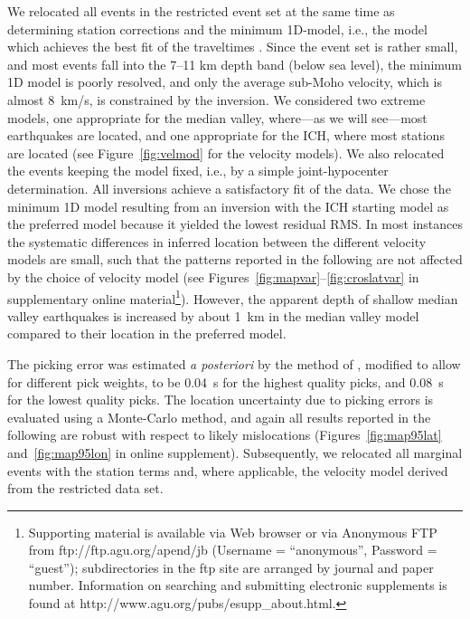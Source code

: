 \documentclass[aguplus]{aguplus}
\newlength{\tw}
\begin{document}
\begin{article}
We relocated all events in the restricted event set at the same time
as determining station corrections and the minimum
1D-model, i.e., the model which achieves the best fit of the traveltimes \citep[using VELEST,][]{kissling94}.  Since the event set is rather small, and most events
fall into the 7--11 km depth band (below sea level), the
minimum 1D model is poorly resolved, and only the average sub-Moho
velocity, which is almost 8~km/s,
is constrained by the inversion.
  We considered two extreme  models, one appropriate for
the median valley, where---as we will see---most earthquakes are located, and
one appropriate for the ICH, where most stations are located (see
Figure~\ref{fig:velmod} for the velocity models). We also
relocated the events keeping the model fixed, i.e., by a simple
joint-hypocenter determination.  All inversions achieve a satisfactory fit of
the data. We chose the minimum 1D model resulting from an inversion with the
ICH starting model as the preferred model because it yielded the
lowest residual RMS.  In most instances the systematic differences in
inferred location between the different velocity models are small, such
that the patterns reported in the following are not affected by the
choice of velocity model (see Figures~\ref{fig:mapvar}--\ref{fig:croslatvar} in supplementary
online material\footnote{Supporting material is available via Web browser or via Anonymous FTP
from ftp://ftp.agu.org/apend/jb (Username = ``anonymous'', Password =
``guest''); subdirectories in the ftp site are arranged by journal and
paper number. Information on searching and submitting electronic
supplements is found at http://www.agu.org/pubs/esupp\_about.html.
}).
However, the apparent depth of shallow median valley earthquakes is
increased by about 1~km in the median valley model compared to their
location in the preferred model.

The picking error was estimated {\it a posteriori} by the method of
\citet{wilcock91}, modified to allow for different pick weights, to be 0.04~s
for the highest quality picks, and 0.08~s for the lowest quality picks.
The location uncertainty due to
picking errors is evaluated using a Monte-Carlo method, and again all
results reported in the following are robust with respect to likely
mislocations (Figures~\ref{fig:map95lat} and~\ref{fig:map95lon}
in online supplement).
Subsequently, we relocated all marginal events with the station
terms and, where applicable, the velocity model derived from the
restricted data set.


\end{article}
\end{document}
